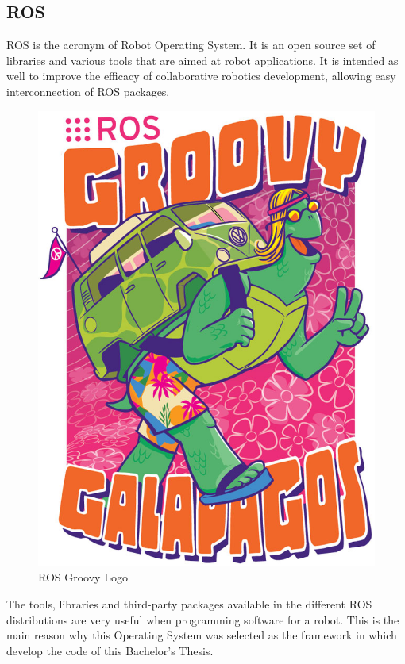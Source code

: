 \subsection{ROS}
\label{ros}

ROS is the acronym of Robot Operating System\cite{ros}. It is an open source set of libraries and various tools that are aimed at robot applications. It is intended as well to improve the efficacy of collaborative robotics development, allowing easy interconnection of ROS packages. 


\begin{figure}[h]
	\begin{center}
    \includegraphics[scale=0.3]{img/ros/groovy.eps}
	\caption[ROS Groovy Logo]{ROS Groovy Logo}
	\end{center}
\end{figure}

The tools, libraries and third-party packages available in the different ROS distributions are very useful when programming software for a robot. This is the main reason why this Operating System was selected as the framework in which develop the code of this Bachelor's Thesis. 
\\

